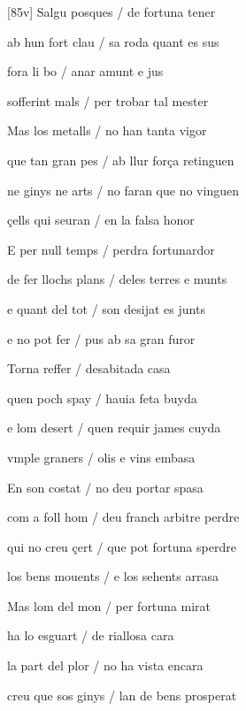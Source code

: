 \documentclass[12pt]{article}
\begin{document}
\begin{estrofa}

 [85v] Salgu posques / de fortuna tener

 ab hun fort clau / sa roda quant es sus

 fora li bo / anar amunt e jus

 sofferint mals / per trobar tal mester

 Mas los metalls / no han tanta vigor

 que tan gran pes / ab llur for\c{c}a retinguen

 ne ginys ne arts / no faran que no vinguen

 \c{c}ells qui seuran / en la falsa honor

\end{estrofa}



\begin{estrofa}

 E per null temps / perdra fortunardor

 de fer llochs plans / deles terres e munts

 e quant del tot / son desijat es junts

 e no pot fer / pus ab sa gran furor

 Torna reffer / desabitada casa

 quen poch spay / hauia feta buyda

 e lom desert / quen requir james cuyda

 vmple graners / olis e vins embasa

\end{estrofa}



\begin{estrofa}

 En son costat / no deu portar spasa

 com a foll hom / deu franch arbitre perdre

 qui no creu \c{c}ert / que pot fortuna sperdre

 los bens mouents / e los sehents arrasa

 Mas lom del mon / per fortuna mirat

 ha lo esguart / de riallosa cara

 la part del plor / no ha vista encara

 creu que sos ginys / lan de bens prosperat

\end{estrofa}
\end{document}
